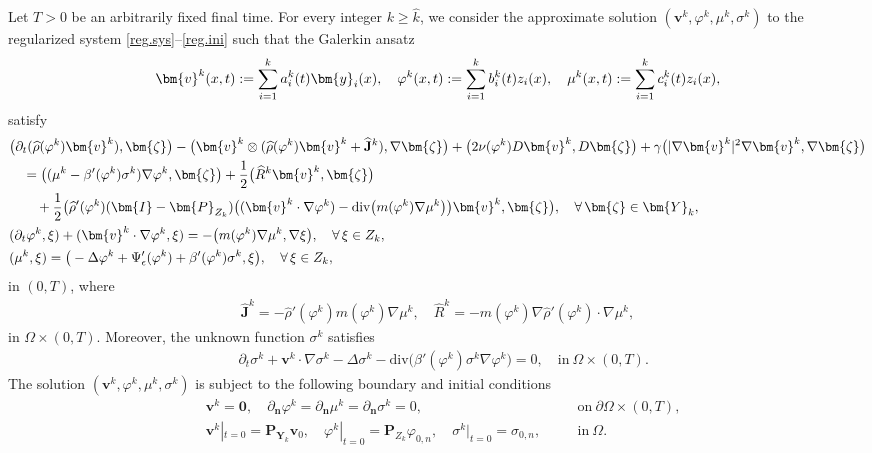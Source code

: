 \documentclass[11pt,reqno]{amsart}
\def\be{\begin{equation}}
\def\ee{\end{equation}}
\def\div{\mathrm{div}}
\def\J{\mathbf{J}}
\def\vv{\bm{v}}
\begin{document}
Let $T>0$ be an arbitrarily fixed final time.
For every integer $k\geq \widehat{k}$, we consider the approximate solution $(\bm{v}^k,\varphi^k,\mu^k,\sigma^k)$ to the regularized system \eqref{reg.sys}--\eqref{reg.ini} such that the Galerkin ansatz
\be
\bm{v}^{k}(x,t):=\sum_{i=1}^{k}a_{i}^{k}(t)\bm{y}_{i}(x),
\quad \varphi^{k}(x,t):=\sum_{i=1}^{k}b_{i}^{k}(t)z_{i}(x),
\quad
\mu^{k}(x,t):=\sum_{i=1}^{k}c_{i}^{k}(t)z_{i}(x),
\notag
\ee
satisfy
%
\begin{align}
&\big(\partial_t  (\widehat{\rho}(\varphi^k) \bm{ v}^{k}),\bm{\zeta}\big) -\big(\vv^k \otimes ( \widehat{\rho}(\varphi^k) \vv^k + \widehat{\J}^k), \nabla \bm{ \zeta}\big)
+\big(  2\nu(\varphi^{k}) D\bm{v}^{k},D\bm{\zeta}\big)
+\gamma \big(|\nabla\vv^k|^2\nabla\vv^k,\nabla \bm{\zeta}\big)
\notag \\
&\quad =\big((\mu^{k} -\beta'(\varphi^k) \sigma^{k})\nabla \varphi^{k},\bm {\zeta}\big)+ \frac12 \big(\widehat{R}^k\vv^k,\bm{\zeta}\big)
\notag\\
&\qquad + \frac12\big(\widehat{\rho}'(\varphi^k)(\bm{I}-\bm{P}_{Z_{k}}) \big((\bm{v}^k\cdot\nabla\varphi^k)-\div \big(m(\varphi^k)\nabla \mu^k\big)\big)\vv^k,\bm{\zeta}\big),\quad \forall\,\bm{\zeta} \in \bm{Y}_{k},
\label{atest.1}\\
&(\partial_t\varphi^k,\xi)+(\bm{v}^k\cdot\nabla\varphi^k,\xi)
=-\big(m(\varphi^k)\nabla \mu^k,\nabla \xi\big),
\quad \forall\, \xi\in Z_{k},
\label{atest.2}\\
& (\mu^k,\xi)=\big(- \Delta \varphi^k + \Psi'_{\epsilon}(\varphi^k)+\beta'(\varphi^k)\sigma^k, \xi\big),
\quad \forall\, \xi\in Z_{k},
 \label{atest.3}
\end{align}
%
in $(0,T)$, where
%
\begin{align}
\label{atest.1b}
\widehat{\J}^k= -\widehat{\rho}'(\varphi^k) m(\varphi^k) \nabla \mu^k,\quad
\widehat{R}^k= -m(\varphi^k)\nabla \widehat{\rho}'(\varphi^k)\cdot \nabla \mu^k,
\end{align}
%
in $\Omega\times(0,T)$.
Moreover, the unknown function $\sigma^k$ satisfies
%
\begin{align}
&\partial_t\sigma^k+\bm{v}^k\cdot\nabla\sigma^k -\Delta\sigma^k-  \mathrm{div}\big(\beta'(\varphi^k)\sigma^k\nabla\varphi^k\big)
=0, \quad \text{in}\ \Omega\times(0,T).
\label{atest.4}
\end{align}
The solution $(\bm{v}^k,\varphi^k,\mu^k,\sigma^k)$
is subject to the following boundary and initial conditions
%
\begin{align}
 & \bm{v}^k=\bm{0},\quad \partial_{\bm{n}}\varphi^k=\partial_{\boldsymbol{n}} \mu^k=\partial_{\boldsymbol{n}} \sigma^k=0,&&\quad \textrm{on}\ \partial\Omega\times(0,T),
\label{boundary1}
\\
& \bm{v}^{k}|_{t=0}=\bm{P}_{\bm{Y}_{k}} \bm{v}_{0},\quad \varphi^{k}|_{t=0}=\bm{P}_{Z_{k}}\varphi_{0,n},\quad  \sigma^{k}|_{t=0}=\sigma_{0,n},&&\quad \text{in}\ \Omega.
\label{atest.ini0}
\end{align}
\end{document}
